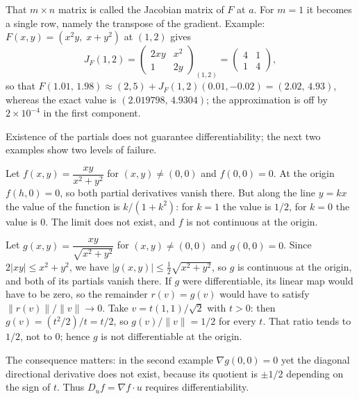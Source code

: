 
That $m\times n$ matrix is called the Jacobian matrix of $F$ at $a$. For $m=1$
it becomes a single row, namely the transpose of the gradient. Example:
$F(x,y)=(x^{2}y,\;x+y^{2})$ at $(1,2)$ gives
\[
  J_{F}(1,2)=\begin{pmatrix}2xy & x^{2}\\ 1 & 2y\end{pmatrix}_{(1,2)}
  =\begin{pmatrix}4&1\\ 1&4\end{pmatrix},
\]
so that $F(1.01,\,1.98)\approx(2,5)+J_{F}(1,2)(0.01,-0.02)=(2.02,\,4.93)$,
whereas the exact value is $(2.019798,\,4.9304)$; the approximation is off by
$2\times10^{-4}$ in the first component.

Existence of the partials does not guarantee differentiability; the next two examples show two
levels of failure.

\begin{contoh}
Let $f(x,y)=\dfrac{xy}{x^{2}+y^{2}}$ for $(x,y)\neq(0,0)$ and $f(0,0)=0$. At the origin
$f(h,0)=0$, so both partial derivatives vanish there. But along the line $y=kx$ the value of
the function is $k/(1+k^{2})$: for $k=1$ the value is $1/2$, for $k=0$ the value is $0$. The
limit does not exist, and $f$ is not continuous at the origin.
\end{contoh}

\begin{contoh}
Let $g(x,y)=\dfrac{xy}{\sqrt{x^{2}+y^{2}}}$ for $(x,y)\neq(0,0)$ and $g(0,0)=0$.
Since $2|xy|\le x^{2}+y^{2}$, we have $|g(x,y)|\le\frac12\sqrt{x^{2}+y^{2}}$, so $g$ is
continuous at the origin, and both of its partials vanish there. If $g$ were differentiable,
its linear map would have to be zero, so the remainder $r(v)=g(v)$ would have to satisfy
$\|r(v)\|/\|v\|\to0$. Take $v=t(1,1)/\sqrt{2}$ with $t>0$: then $g(v)=(t^{2}/2)/t=t/2$, so
$g(v)/\|v\|=1/2$ for every $t$. That ratio tends to $1/2$, not to $0$; hence $g$ is not
differentiable at the origin.
\end{contoh}

The consequence matters: in the second example $\nabla g(0,0)=0$ yet the diagonal directional
derivative does not exist, because its quotient is $\pm1/2$ depending on the sign of $t$. Thus
$D_{u}f=\nabla f\cdot u$ requires differentiability.

